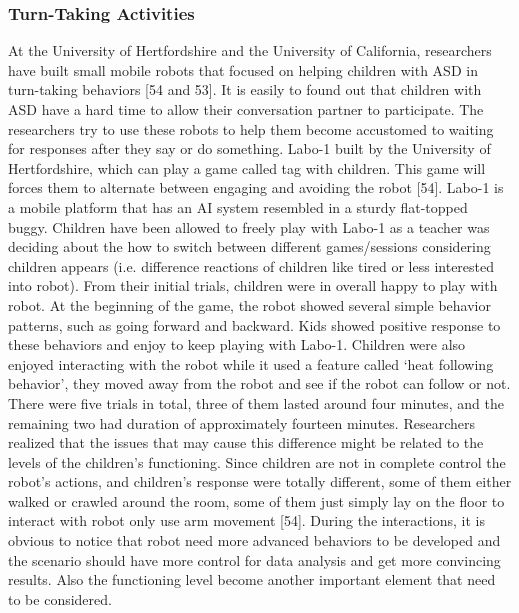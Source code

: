 \subsubsection{Turn-Taking Activities}
At the University of Hertfordshire and the University of California, researchers have built small mobile robots that focused on helping children with ASD in turn-taking behaviors [54 and 53]. It is easily to found out that children with ASD have a hard time to allow their conversation partner to participate. The researchers try to use these robots to help them become accustomed to waiting for responses after they say or do something. Labo-1 built by the University of Hertfordshire, which can play a game called tag with children. This game will forces them to alternate between engaging and avoiding the robot [54].
Labo-1 is a mobile platform that has an AI system resembled in a sturdy flat-topped buggy. Children have been allowed to freely play with Labo-1 as a teacher was deciding about the how to switch between different games/sessions considering children appears (i.e. difference reactions of children like tired or less interested into robot). From their initial trials, children were in overall happy to play with robot. At the beginning of the game, the robot showed several simple behavior patterns, such as going forward and backward. Kids showed positive response to these behaviors and enjoy to keep playing with Labo-1. Children were also enjoyed interacting with the robot while it used a feature called ‘heat following behavior’, they moved away from the robot and see if the robot can follow or not. There were five trials in total, three of them lasted around four minutes, and the remaining two had duration of approximately fourteen minutes. Researchers realized that the issues that may cause this difference might be related to the levels of the children’s functioning. Since children are not in complete control the robot’s actions, and children’s response were totally different, some of them either walked or crawled around the room, some of them just simply lay on the floor to interact with robot only use arm movement [54].
During the interactions, it is obvious to notice that robot need more advanced behaviors to be developed and the scenario should have more control for data analysis and get more convincing results. Also the functioning level become another important element that need to be considered.
